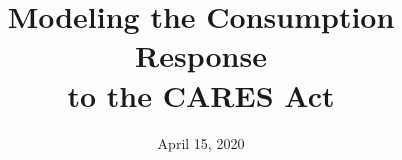 
\documentclass[titlepage]{\econtex}\providecommand{\texname}{ConsumptionResponse}%
\usepackage{\econtexRoot/LaTeX/ConsumptionResponse}

\usepackage[twoside,marginparwidth=0in,left=1.25in,right=1.25in,top=1.25in,bottom=1.25in]{geometry}\usepackage{layouts}

\renewcommand{\forcedate}{April 15, 2020}





%





\begin{verbatimwrite}{\jobname.title}
ConsumptionResponse
\end{verbatimwrite}

\hfill{\tiny \jobname, \today, \currenttime}

\title{Modeling the Consumption Response\\ to the CARES Act}

{
\author{
  Christopher D. Carroll\authNum \\ {\small JHU}
  \and
  Edmund Crawley\authNum   \\ {\small FRB}
  \and
  Jiri Slacalek\authNum    \\ {\small ECB}
  \and
  Matthew N. White\authNum \\ {\small UDel}
}
} %



\date{\forcedate}
\maketitle

